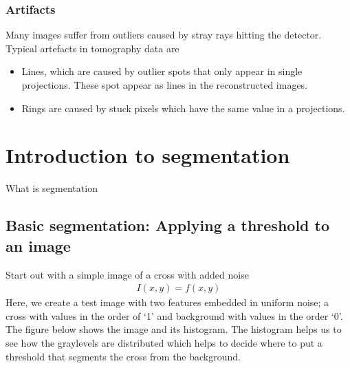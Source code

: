 \documentclass[letterpaper,10pt,english]{sphinxmanual}
\begin{document}
\subsubsection{Artifacts}
\label{\detokenize{ML4NeutronImageSegmentation:artifacts}}
Many images suffer from outliers caused by stray rays hitting the detector. Typical artefacts in tomography data are
\begin{itemize}
\item {} 
Lines, which are caused by outlier spots that only appear in single projections. These spot appear as lines in the reconstructed images.

\item {} 
Rings are caused by stuck pixels which have the same value in a projections.

\end{itemize}


\section{Introduction to segmentation}
\label{\detokenize{ML4NeutronImageSegmentation:introduction-to-segmentation}}
What is segmentation


\subsection{Basic segmentation: Applying a threshold to an image}
\label{\detokenize{ML4NeutronImageSegmentation:basic-segmentation-applying-a-threshold-to-an-image}}
Start out with a simple image of a cross with added noise
\begin{equation*}
\begin{split} I(x,y) = f(x,y) \end{split}
\end{equation*}
Here, we create a test image with two features embedded in uniform noise; a cross with values in the order of ‘1’ and background with values in the order ‘0’. The figure below shows the image and its histogram. The histogram helps us to see how the graylevels are distributed which helps to decide where to put a threshold that segments the cross from the background.
\end{document}
